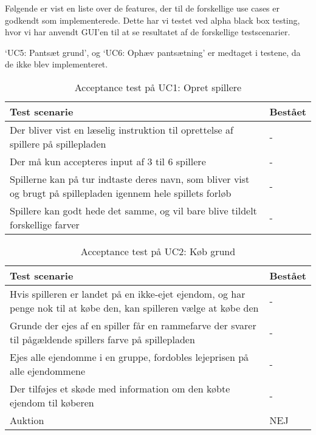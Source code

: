 \documentclass[class=article, crop=false]{standalone}
\begin{document}
    Følgende er vist en liste over de features, der til de forskellige use cases er godkendt som implementerede. Dette har vi testet ved alpha black box testing, hvor vi har anvendt GUI’en til at se resultatet af de forskellige testscenarier. \par
    ‘UC5: Pantsæt grund’, og ‘UC6: Ophæv pantsætning’ er medtaget i testene, da de ikke blev implementeret.

    \begin{table}[H]
        \caption{Acceptance test på UC1: Opret spillere }
        \begin{tabularx}{\textwidth}{|X|l|}
            \hline
            \textbf{Test scenarie}       & \textbf{Bestået}   \\ \hline
            Der bliver vist en læselig instruktion til oprettelse af spillere på spillepladen     & - \\ \hline
            Der må kun accepteres input af 3 til 6 spillere    & - \\ \hline
            Spillerne kan på tur indtaste deres navn, som bliver vist og brugt på spillepladen igennem hele spillets forløb     & -  \\ \hline
            Spillere kan godt hede det samme, og vil bare blive tildelt forskellige farver     & - \\ \hline
        \end{tabularx}
    \end{table}


    \begin{table}[H]
        \caption{Acceptance test på UC2: Køb grund}
        \begin{tabularx}{\textwidth}{|X|l|}
            \hline
            \textbf{Test scenarie}       & \textbf{Bestået}   \\ \hline
            Hvis spilleren er landet på en ikke-ejet ejendom, og har penge nok til at købe den, kan spilleren vælge at købe den    & - \\ \hline
            Grunde der ejes af en spiller får en rammefarve der svarer til pågældende spillers farve på spillepladen    & - \\ \hline
            Ejes alle ejendomme i en gruppe, fordobles lejeprisen på alle ejendommene     & -  \\ \hline
            Der tilføjes et skøde med information om den købte ejendom til køberen     & - \\ \hline
            Auktion    & NEJ \\ \hline
        \end{tabularx}
    \end{table}
\end{document}

